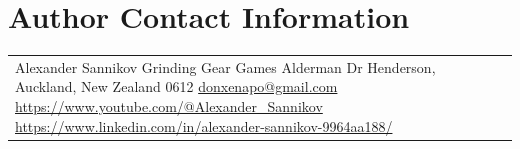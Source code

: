 \documentclass{jcgt}
\begin{document}
\section*{Author Contact Information}

\hspace{-2mm}\begin{tabular}{p{}p{}}
Alexander Sannikov \newline
Grinding Gear Games \newline
6 Alderman Dr \newline
Henderson, Auckland, New Zealand 0612 \newline
\href{mailto:donxenapo@gmail.com}{donxenapo@gmail.com} \newline
\href{https://www.youtube.com/@Alexander_Sannikov}{https://www.youtube.com/@Alexander\_Sannikov} \newline
\href{https://www.linkedin.com/in/alexander-sannikov-9964aa188/}{https://www.linkedin.com/in/alexander-sannikov-9964aa188/}

\end{tabular}


\afterdoc
\end{document}
